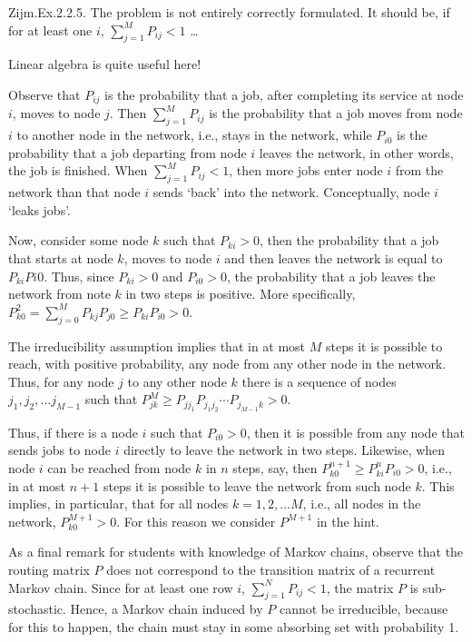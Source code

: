 \begin{exercise}
  Zijm.Ex.2.2.5. The problem is not entirely correctly formulated. It
  should be, if for at least one $i$, $\sum_{j=1}^M P_{i j} <1$ \ldots
\begin{solution}
Linear algebra is quite useful here!

Observe that $P_{i j}$ is the probability that a job, after completing
its service at node $i$, moves to node $j$. Then $\sum_{j=1}^M P_{i j}$
is the probability that a job moves from node $i$ to another node in
the network, i.e., stays in the network, while $P_{i0}$ is the
probability that a job departing from node $i$ leaves the network, in
other words, the job is finished. When $\sum_{j=1}^M P_{i j} < 1$, then
more jobs enter node $i$ from the network than that node $i$ sends
`back' into the network. Conceptually, node $i$ `leaks jobs'.

  Now, consider some node $k$ such that $P_{ki} > 0$, then the
  probability that a job that starts at node $k$, moves to node $i$
  and then leaves the network is equal to $P_{ki}P{i0}$. Thus, since
  $P_{ki}>0$ and $P_{i0}>0$, the probability that a job leaves the
  network from note $k$ in two steps is positive.  More specifically,
  $P^2_{k0} = \sum_{j=0}^M P_{kj}P_{j0} \geq P_{ki}P_{i0} > 0$. 

  The irreducibility assumption implies that in at most $M$ steps it
  is possible to reach, with positive probability, any node from any
  other node in the network. Thus, for any node $j$ to any other node
  $k$ there is a sequence of nodes $j_1, j_2, \ldots j_{M-1}$ such
  that  $P^{M}_{jk} \geq P_{j j_1}P_{j_1 j_2}\cdots P_{j_{M-1}k} > 0$.


  Thus, if there is a node $i$ such that $P_{i0}>0$, then it is
  possible from any node that sends jobs to node $i$ directly to leave
  the network in two steps. Likewise, when node $i$ can be reached
  from node $k$ in $n$ steps, say, then
  $P^{n+1}_{k0} \geq P^n_{ki}P_{i0} > 0$, i.e., in at most $n+1$ steps
  it is possible to leave the network from such node $k$. This
  implies, in particular, that for all nodes $k=1,2,\ldots M$, i.e.,
  all nodes in the network, $P^{M+1}_{k0} >0$.  For this reason we
  consider $P^{M+1}$ in the hint.


  As a final remark for students with knowledge of Markov chains,
  observe that the routing matrix $P$ does not correspond to the
  transition matrix of a recurrent Markov chain. Since for at least
  one row $i$, $\sum_{j=1}^N P_{i j}<1$, the matrix $P$ is
  sub-stochastic. Hence, a Markov chain induced by $P$ cannot be
  irreducible, because for this to happen, the chain must stay in some
  absorbing set with probability 1.
\end{solution}
\end{exercise}

